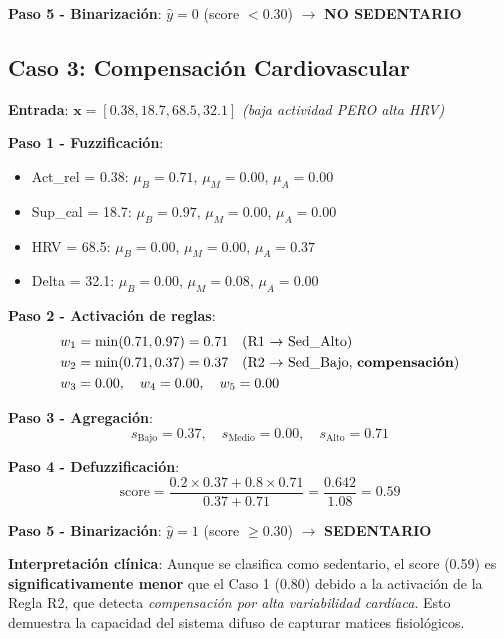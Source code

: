 \documentclass[12pt,letterpaper,twoside]{report}
\newcommand{\vect}[1]{\boldsymbol{#1}}
\begin{document}
\textbf{Paso 5 - Binarización}: $\hat{y} = 0$ (score $< 0.30$) $\to$ \textbf{NO SEDENTARIO}

\subsection{Caso 3: Compensación Cardiovascular}

\textbf{Entrada}: $\vect{x} = [0.38, 18.7, 68.5, 32.1]$ \textit{(baja actividad PERO alta HRV)}

\textbf{Paso 1 - Fuzzificación}:

\begin{itemize}[noitemsep]
\item Act\_rel = 0.38: $\mu_B = 0.71$, $\mu_M = 0.00$, $\mu_A = 0.00$
\item Sup\_cal = 18.7: $\mu_B = 0.97$, $\mu_M = 0.00$, $\mu_A = 0.00$
\item HRV = 68.5: $\mu_B = 0.00$, $\mu_M = 0.00$, $\mu_A = 0.37$
\item Delta = 32.1: $\mu_B = 0.00$, $\mu_M = 0.08$, $\mu_A = 0.00$
\end{itemize}

\textbf{Paso 2 - Activación de reglas}:
\begin{align*}
w_1 &= \min(0.71, 0.97) = 0.71 \quad \text{(R1 $\to$ Sed\_Alto)} \\
w_2 &= \min(0.71, 0.37) = 0.37 \quad \text{(R2 $\to$ Sed\_Bajo, \textbf{compensación})} \\
w_3 &= 0.00, \quad w_4 = 0.00, \quad w_5 = 0.00
\end{align*}

\textbf{Paso 3 - Agregación}:
\begin{equation*}
s_{\text{Bajo}} = 0.37, \quad s_{\text{Medio}} = 0.00, \quad s_{\text{Alto}} = 0.71
\end{equation*}

\textbf{Paso 4 - Defuzzificación}:
\begin{equation*}
\text{score} = \frac{0.2 \times 0.37 + 0.8 \times 0.71}{0.37 + 0.71} = \frac{0.642}{1.08} = 0.59
\end{equation*}

\textbf{Paso 5 - Binarización}: $\hat{y} = 1$ (score $\geq 0.30$) $\to$ \textbf{SEDENTARIO}

\textbf{Interpretación clínica}: Aunque se clasifica como sedentario, el score (0.59) es \textbf{significativamente menor} que el Caso 1 (0.80) debido a la activación de la Regla R2, que detecta \textit{compensación por alta variabilidad cardíaca}. Esto demuestra la capacidad del sistema difuso de capturar matices fisiológicos.
\end{document}
